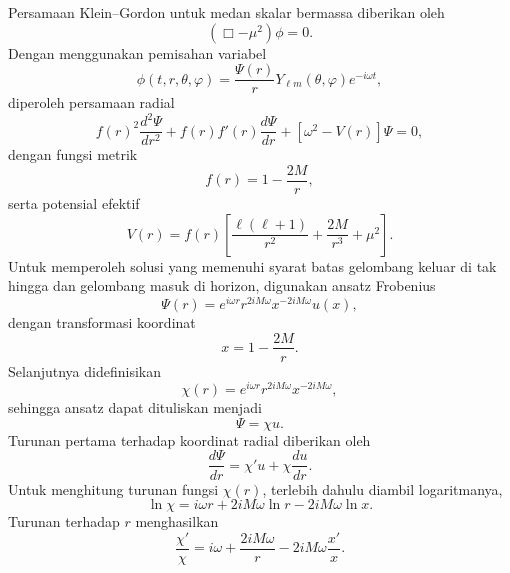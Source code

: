 Persamaan Klein--Gordon untuk medan skalar bermassa diberikan oleh
\begin{equation}
    \left(\Box-\mu^2\right)\phi=0.
\end{equation}
Dengan menggunakan pemisahan variabel
\begin{equation}
    \phi(t,r,\theta,\varphi) = \frac{\Psi(r)}{r} Y_{\ell m}(\theta,\varphi) e^{-i\omega t},
\end{equation}
diperoleh persamaan radial
\begin{equation}
    f(r)^2\frac{d^2\Psi}{dr^2} + f(r)f'(r)\frac{d\Psi}{dr} + \left[ \omega^2 - V(r) \right]\Psi=0,
\end{equation}
dengan fungsi metrik
\begin{equation}
    f(r)=1-\frac{2M}{r},
\end{equation}
serta potensial efektif
\begin{equation}
    V(r) = f(r) \left[ \frac{\ell(\ell+1)}{r^2} + \frac{2M}{r^3} + \mu^2 \right].
\end{equation}
Untuk memperoleh solusi yang memenuhi syarat batas gelombang keluar di tak hingga dan gelombang masuk di horizon, digunakan ansatz Frobenius
\begin{equation}
    \Psi(r) = e^{i\omega r} r^{2iM\omega} x^{-2iM\omega} u(x),
\end{equation}
dengan transformasi koordinat
\begin{equation}
    x = 1-\frac{2M}{r}.
\end{equation}
Selanjutnya didefinisikan
\begin{equation}
    \chi(r) = e^{i\omega r} r^{2iM\omega} x^{-2iM\omega},
\end{equation}
sehingga ansatz dapat dituliskan menjadi
\begin{equation}
    \Psi=\chi u.
\end{equation}
Turunan pertama terhadap koordinat radial diberikan oleh
\begin{equation}
    \frac{d\Psi}{dr} = \chi' u + \chi\frac{du}{dr}.
\end{equation}
Untuk menghitung turunan fungsi $\chi(r)$, terlebih dahulu diambil logaritmanya,
\begin{equation}
    \ln\chi = i\omega r + 2iM\omega\ln r - 2iM\omega\ln x.
\end{equation}
Turunan terhadap $r$ menghasilkan
\begin{equation}
    \frac{\chi'}{\chi} = i\omega + \frac{2iM\omega}{r} - 2iM\omega\frac{x'}{x}.
\end{equation}
